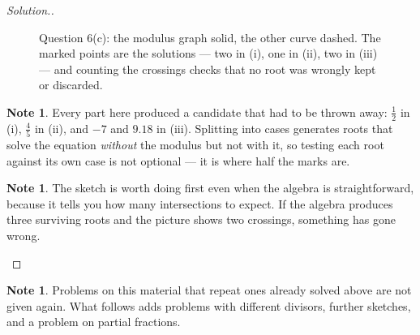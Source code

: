 \documentclass[11pt,a4paper]{article}
\theoremstyle{definition}
\newtheorem{note}[thm]{Note}
\newenvironment{solution}
  {\renewcommand{\qedsymbol}{}\begin{proof}[\textit{Solution}.]}
  {\end{proof}}
\begin{document}
\begin{solution}
\begin{figure}[H]
\vspace{1.4em}

\caption{Question 6(c): the modulus graph solid, the other curve dashed. The marked points are the solutions --- two in (i), one in (ii), two in (iii) --- and counting the crossings checks that no root was wrongly kept or discarded.}
\end{figure}

\begin{note}
Every part here produced a candidate that had to be thrown away: $\frac{1}{2}$ in (i),
$\frac{4}{5}$ in (ii), and $-7$ and $9.18$ in (iii). Splitting into cases generates
roots that solve the equation \emph{without} the modulus but not with it, so testing
each root against its own case is not optional --- it is where half the marks are.
\end{note}

\begin{note}
The sketch is worth doing first even when the algebra is straightforward, because it
tells you how many intersections to expect. If the algebra produces three surviving
roots and the picture shows two crossings, something has gone wrong.
\end{note}
\end{solution}


\begin{note}
Problems on this material that repeat ones already solved above are not given
again. What follows adds problems with different divisors, further sketches, and
a problem on partial fractions.
\end{note}
\end{document}
